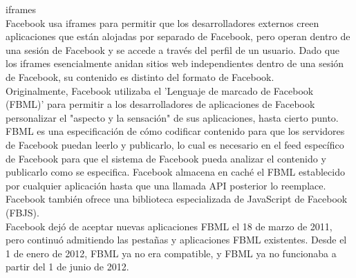 \begin{itemize}
		iframes\\
		Facebook usa iframes para permitir que los desarrolladores externos creen aplicaciones que están alojadas por separado de Facebook, pero operan dentro de una sesión de Facebook y se accede a través del perfil de un usuario. Dado que los iframes esencialmente anidan sitios web independientes dentro de una sesión de Facebook, su contenido es distinto del formato de Facebook. \\
		
		Originalmente, Facebook utilizaba el 'Lenguaje de marcado de Facebook (FBML)' para permitir a los desarrolladores de aplicaciones de Facebook personalizar el "aspecto y la sensación" de sus aplicaciones, hasta cierto punto. FBML es una especificación de cómo codificar contenido para que los servidores de Facebook puedan leerlo y publicarlo, lo cual es necesario en el feed específico de Facebook para que el sistema de Facebook pueda analizar el contenido y publicarlo como se especifica. Facebook almacena en caché el FBML establecido por cualquier aplicación hasta que una llamada API posterior lo reemplace. Facebook también ofrece una biblioteca especializada de JavaScript de Facebook (FBJS).\\
		
		Facebook dejó de aceptar nuevas aplicaciones FBML el 18 de marzo de 2011, pero continuó admitiendo las pestañas y aplicaciones FBML existentes. Desde el 1 de enero de 2012, FBML ya no era compatible, y FBML ya no funcionaba a partir del 1 de junio de 2012. 
	\end{itemize}



